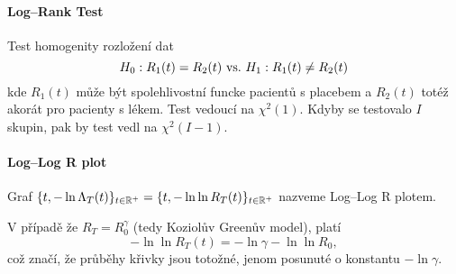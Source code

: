 \paragraph{Log--Rank Test}
Test homogenity rozložení dat 
$$H_0: R_1(t) = R_2(t) ~\text{vs.}~ H_1: R_1(t) \neq R_2(t)$$
kde $R_1(t)$ může být spolehlivostní funcke pacientů s placebem a $R_2(t)$ totéž akorát pro pacienty s lékem. Test vedoucí na $\chi^2(1)$. Kdyby se testovalo $I$ skupin, pak by test vedl na $\chi^2(I-1)$.
\paragraph{Log--Log R plot}
\begin{define}
	Graf $\lbrace t, -\ln\Lambda_{T}(t) \rbrace_{t\in \mathbb{R}^{+}} = \lbrace t, -\ln\ln R_{T}(t) \rbrace_{t\in \mathbb{R}^{+}}$ nazveme Log--Log R plotem. 
\end{define}
V případě že $R_T = R_0^{\gamma}$ (tedy Koziolův Greenův model), platí 
$$-\ln\ln R_{T}(t) = -\ln\gamma -  \ln\ln R_0,$$
což značí, že průběhy křivky jsou totožné, jenom posunuté o konstantu $-\ln \gamma$.
